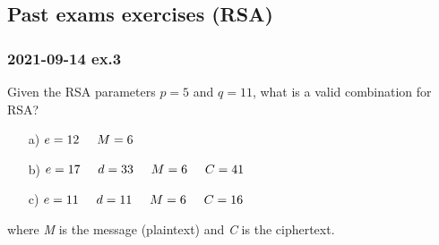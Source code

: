 \newpage
\subsection{Past exams exercises (RSA)}
\subsubsection{2021-09-14 ex.3}
Given the RSA parameters $p=5$ and $q=11$, what is a valid combination for RSA?
\begin{enumerate}
    \item[a)]$e=12\hspace{0.5cm}M=6$
    \item[b)]$e=17\hspace{0.5cm}d=33\hspace{0.5cm}M=6\hspace{0.5cm}C=41$
    \item[c)]$e=11\hspace{0.5cm}d=11\hspace{0.5cm}M=6\hspace{0.5cm}C=16$
\end{enumerate}
where \textit{M} is the message (plaintext) and \textit{C} is the ciphertext.

